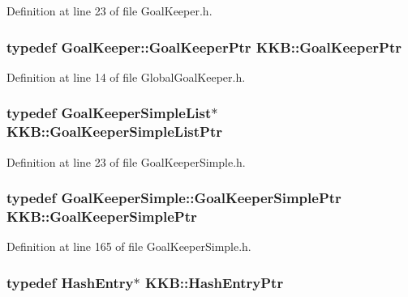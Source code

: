 Definition at line 23 of file Goal\+Keeper.\+h.

\subsubsection[{\texorpdfstring{Goal\+Keeper\+Ptr}{GoalKeeperPtr}}]{\setlength{\rightskip}{0pt plus 5cm}typedef {\bf Goal\+Keeper\+::\+Goal\+Keeper\+Ptr} {\bf K\+K\+B\+::\+Goal\+Keeper\+Ptr}}\hypertarget{namespace_k_k_b_ae74d71076d6a6eb363f18a563ac0785a}{}\label{namespace_k_k_b_ae74d71076d6a6eb363f18a563ac0785a}


Definition at line 14 of file Global\+Goal\+Keeper.\+h.

\subsubsection[{\texorpdfstring{Goal\+Keeper\+Simple\+List\+Ptr}{GoalKeeperSimpleListPtr}}]{\setlength{\rightskip}{0pt plus 5cm}typedef {\bf Goal\+Keeper\+Simple\+List}$\ast$ {\bf K\+K\+B\+::\+Goal\+Keeper\+Simple\+List\+Ptr}}\hypertarget{namespace_k_k_b_a4883048cbce42bdc9472fb46ae43463f}{}\label{namespace_k_k_b_a4883048cbce42bdc9472fb46ae43463f}


Definition at line 23 of file Goal\+Keeper\+Simple.\+h.

\subsubsection[{\texorpdfstring{Goal\+Keeper\+Simple\+Ptr}{GoalKeeperSimplePtr}}]{\setlength{\rightskip}{0pt plus 5cm}typedef {\bf Goal\+Keeper\+Simple\+::\+Goal\+Keeper\+Simple\+Ptr} {\bf K\+K\+B\+::\+Goal\+Keeper\+Simple\+Ptr}}\hypertarget{namespace_k_k_b_a809c0531dcbb9300a8a80291ec5896ab}{}\label{namespace_k_k_b_a809c0531dcbb9300a8a80291ec5896ab}


Definition at line 165 of file Goal\+Keeper\+Simple.\+h.

\subsubsection[{\texorpdfstring{Hash\+Entry\+Ptr}{HashEntryPtr}}]{\setlength{\rightskip}{0pt plus 5cm}typedef Hash\+Entry$\ast$ {\bf K\+K\+B\+::\+Hash\+Entry\+Ptr}}\hypertarget{namespace_k_k_b_a52f8dc7216f438c7d92cb730d1e4281a}{}\label{namespace_k_k_b_a52f8dc7216f438c7d92cb730d1e4281a}


